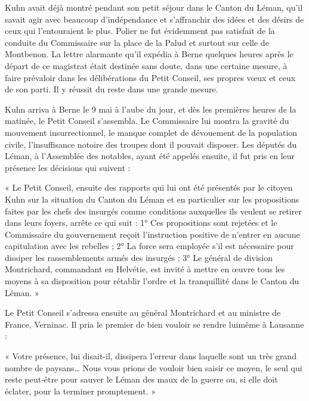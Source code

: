 \documentclass[french,twoside]{book} %
\newenvironment{quoteblock}%
  {\begin{quoting}}
  {\end{quoting}}
\newenvironment{quotebar}{%
    \def\FrameCommand{{\color{rubric!10!}\vrule width 0.5em} \hspace{0.9em}}%
    \def\OuterFrameSep{\itemsep} %
    \MakeFramed {\advance\hsize-\width \FrameRestore}
  }%
  {%
    \endMakeFramed
  }
\renewenvironment{quoteblock}%
  {%
    \savenotes
    \setstretch{0.9}
    \begin{quotebar}
  }
  {%
    \end{quotebar}
    \spewnotes
  }
\begin{document}
\noindent Kuhn avait déjà montré pendant son petit séjour dans le Canton du Léman, qu’il savait agir avec beaucoup d’indépendance et s’affranchir des idées et des désirs de ceux qui l’entouraient le plus. Polier ne fut évidemment pas satisfait de la conduite du Commissaire sur la place de la Palud et surtout sur celle de Montbenon. La lettre alarmante qu’il expédia à Berne quelques heures après le départ de ce magistrat était destinée sans doute, dans une certaine mesure, à faire prévaloir dans les délibérations du Petit Conseil, ses propres vœux et ceux de son parti. Il y réussit du reste dans une grande mesure.\par
Kuhn arriva à Berne le 9 mai à l’aube du jour, et dès les premières heures de la matinée, le Petit Conseil s’assembla. Le Commissaire lui montra la gravité du mouvement insurrectionnel, le manque complet de dévouement de la population civile, l’insuffisance notoire des troupes dont il pouvait disposer. Les députés du Léman, à l’Assemblée des notables, ayant été appelés ensuite, il fut pris en leur présence les décisions qui suivent :\par

\begin{quoteblock}
 \noindent « Le Petit Conseil, ensuite des rapports qui lui ont été présentés par le citoyen Kuhn sur la situation du Canton du Léman et en particulier sur les propositions faites par les chefs des insurgés comme conditions auxquelles ils veulent se retirer dans leurs foyers, arrête ce qui suit : 1° Ces propositions sont rejetées et le Commissaire du gouvernement reçoit l’instruction positive de n’entrer en aucune capitulation avec les rebelles ; 2° La force sera employée s’il est nécessaire pour dissiper les rassemblements armés des insurgés ; 3° Le général de division Montrichard, commandant en Helvétie, est invité à mettre en œuvre tous les moyens à sa disposition pour rétablir l’ordre et la tranquillité dans le Canton du Léman. »
 \end{quoteblock}

\noindent Le Petit Conseil s’adressa ensuite au général Montrichard et au ministre de France, Verninac. Il pria le premier de bien vouloir se rendre luimême à Lausanne :\par

\begin{quoteblock}
\noindent « Votre présence, lui disait-il, dissipera l’erreur dans laquelle sont un très grand nombre de paysans… Nous vous prions de vouloir bien saisir ce moyen, le seul qui reste peut-être pour sauver le Léman des maux de la guerre ou, si elle doit éclater, pour la terminer promptement. »\end{quoteblock}
\end{document}
